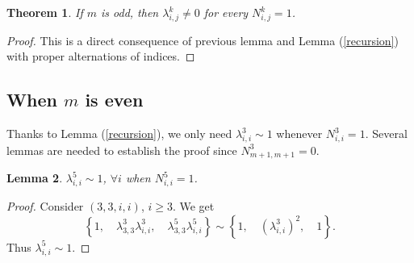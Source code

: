 \documentclass{article}
\newtheorem{lemma}{Lemma}[section]
\newtheorem{theorem}[lemma]{Theorem}
\begin{document}



\begin{theorem}
If $m$ is odd, then $\lambda_{i,j}^k\neq 0$ for every $N_{i,j}^k =1$.
\end{theorem}
\begin{proof}
This is a direct consequence of previous lemma and Lemma (\ref{recursion}) with proper
alternations of indices.
\end{proof}

\subsection{When $m$ is even}
Thanks to Lemma (\ref{recursion}), 
we only need
$\lambda_{i,i}^3\sim 1$
whenever $N_{i,i}^3=1$.
Several lemmas are needed to establish the proof
since $N_{m+1,m+1}^3=0$.

\begin{lemma}\label{5,i,i}
$\lambda_{i,i}^5\sim 1$, $\forall i$ when $N_{i,i}^5=1$.
\end{lemma}
\begin{proof}
Consider $(3,3,i,i)$, $i\geq 3$.
We get 
$$
\left\{1,\quad
\lambda_{3,3}^3\lambda_{i,i}^3,\quad
\lambda_{3,3}^5\lambda_{i,i}^5\right\}
\sim 
\left\{1,\quad
\left(\lambda_{i,i}^3\right)^2,\quad
1\right\}.$$
Thus $\lambda_{i,i}^5\sim 1$.
\end{proof}
\end{document}
